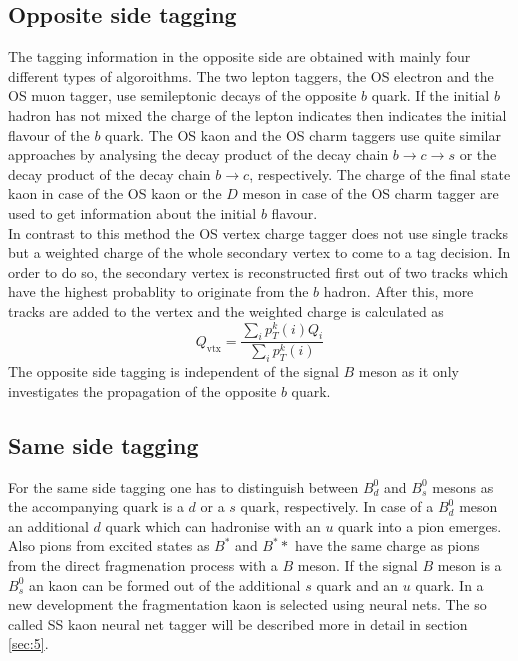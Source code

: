 \documentclass{PoS}
\begin{document}
\subsection{Opposite side tagging}

The tagging information in the opposite side are obtained with mainly four different types of algoroithms. The two lepton taggers, the OS electron and the OS muon tagger, use semileptonic decays of the opposite $b$ quark. If the initial $b$ hadron has not mixed the charge of the lepton indicates then indicates the initial flavour of the $b$ quark. The OS kaon and the OS charm taggers use quite similar approaches by analysing the decay product of the decay chain $b\to c\to s$ or the decay product of the decay chain $b\to c$, respectively. The charge of the final state kaon in case of the OS kaon or the $D$ meson in case of the OS charm tagger are used to get information about the initial $b$ flavour. \\
In contrast to this method the OS vertex charge tagger does not use single tracks but a weighted charge of the whole secondary vertex to come to a tag decision. In order to do so, the secondary vertex is reconstructed first out of two tracks which have the highest probablity to originate from the $b$ hadron. After this, more tracks are added to the vertex and the weighted charge is calculated as
\begin{equation}
Q_\text{vtx}=\frac{\sum_i p_T^k(i)Q_i}{\sum_i p_T^k(i)}
\end{equation}  
The opposite side tagging is independent of the signal $B$ meson as it only investigates the propagation of the opposite $b$ quark.

\subsection{Same side tagging}

For the same side tagging one has to distinguish between $B_d^0$ and $B_s^0$ mesons as the accompanying quark is a $d$ or a $s$ quark, respectively. In case of a $B_d^0$ meson an additional $d$ quark which can hadronise with an $u$ quark into a pion emerges. Also pions from excited states as $B^*$ and $B^**$ have the same charge as pions from the direct fragmenation process with a $B$ meson. If the signal $B$ meson is a $B_s^0$ an kaon can be formed out of the additional $s$ quark and an $u$ quark. In a new development the fragmentation kaon is selected using neural nets. The so called SS kaon neural net tagger will be described more in detail in section \ref{sec:5}.
\end{document}
